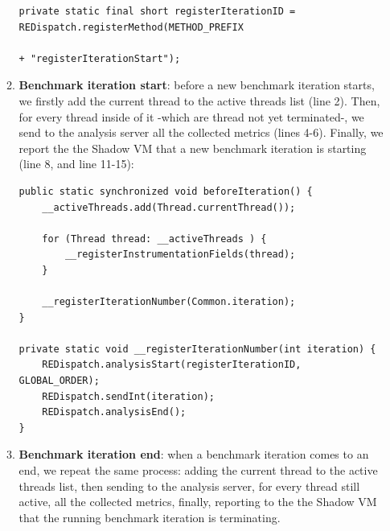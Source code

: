 \documentclass[]{usiinfthesis}
\begin{document}
\begin{itemize}
\begin{enumerate}
        \vspace*{0.25cm}
        \begin{verbatim}
private static final short registerIterationID = REDispatch.registerMethod(METHOD_PREFIX 
                                                                + "registerIterationStart");
    \end{verbatim}
    \vspace*{0.25cm}
    \item \textbf{Benchmark iteration start}: before a new benchmark iteration starts, we firstly add the current thread to the active threads list (line 2). Then, for every thread inside of it -which are thread not yet terminated-, we send to the analysis server all the collected metrics (lines 4-6). Finally, we report the the Shadow VM that a new benchmark iteration is starting (line 8, and line 11-15):
    \vspace*{0.25cm}
        \begin{verbatim}
public static synchronized void beforeIteration() {
    __activeThreads.add(Thread.currentThread());

    for (Thread thread: __activeThreads ) {
        __registerInstrumentationFields(thread);
    }

    __registerIterationNumber(Common.iteration);
}

private static void __registerIterationNumber(int iteration) {
    REDispatch.analysisStart(registerIterationID, GLOBAL_ORDER);
    REDispatch.sendInt(iteration);
    REDispatch.analysisEnd();
}
    \end{verbatim}
    \vspace*{0.25cm}
    \item \textbf{Benchmark iteration end}: when a benchmark iteration comes to an end, we repeat the same process: adding the current thread to the active threads list, then sending to the analysis server, for every thread still active, all the collected metrics, finally, reporting to the the Shadow VM that the running benchmark iteration is terminating.
    \end{enumerate}
\end{itemize}
\end{document}
